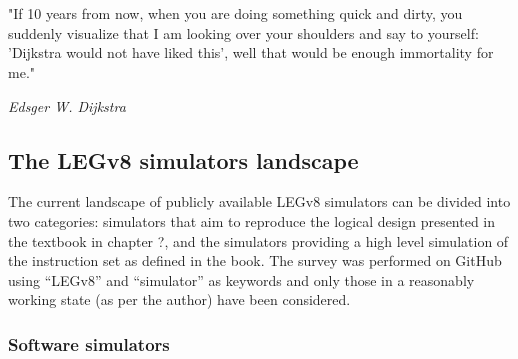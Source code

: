 \chapter{}

\epigraph{"If 10 years from now, when you are doing something quick and dirty, you suddenly visualize that I am looking over your shoulders and say to yourself: 'Dijkstra would not have liked this', well that would be enough immortality for me."}{\textit{Edsger W. Dijkstra}}

\section*{The LEGv8 simulators landscape}

The current landscape of publicly available LEGv8 simulators can be divided into two categories: simulators that aim to reproduce the logical design presented in the textbook in chapter ?, and the simulators providing a high level simulation of the instruction set as defined in the book.
The survey was performed on GitHub using ``LEGv8'' and ``simulator'' as keywords and only those in a reasonably working state (as per the author) have been considered.

\subsection*{Software simulators}

\begin{table}[H]
	\centering
	\caption{The surveyed software simulators}
\end{table}

